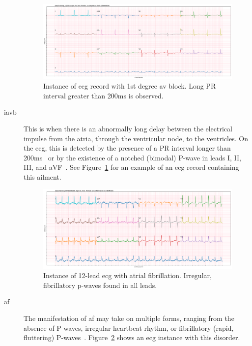 \documentclass[\main/thesis.tex]{subfiles}
\begin{document}
\begin{description}
    \begin{figure}[ht]
        \centering
        \includegraphics[width=14cm]{figure/IAVB/full_0_1951.pdf}
        \caption{Instance of \gls{ecg} record with 1st degree av block. Long PR interval greater than 200ms is observed.}
        \label{fig:full_IAVB}
    \end{figure}
    \item[\gls{iavb}] This is when there is an abnormally long delay between the electrical impulse from the atria, through the ventricular node, to the ventricles. On the \gls{ecg}, this is detected by the presence of a PR interval longer than 200ms~\cite{carroz_pseudo-pacemaker_2010} or by the existence of a notched (bimodal) P-wave in leads I, II, III, and aVF~\cite{bayes_de_luna_diagnosis_2017}. See Figure~\ref{fig:full_IAVB} for an example of an \gls{ecg} record containing this ailment.
    \begin{figure}[ht]
        \centering
        \includegraphics[width=14cm]{figure/AF/full_0_3453.pdf}
        \caption{Instance of 12-lead \gls{ecg} with atrial fibrillation. Irregular, fibrillatory p-waves found in all leads.}
        \label{fig:full_AF}
    \end{figure}
    \item[\gls{af}] The manifestation of \gls{af} may take on multiple forms, ranging from the absence of P waves, irregular heartbeat rhythm, or fibrillatory (rapid, fluttering) P-waves~\cite{podrid2001cardiac,afib-ecg}. Figure~\ref{fig:full_AF} shows an \gls{ecg} instance with this disorder.

\end{description}
\end{document}
